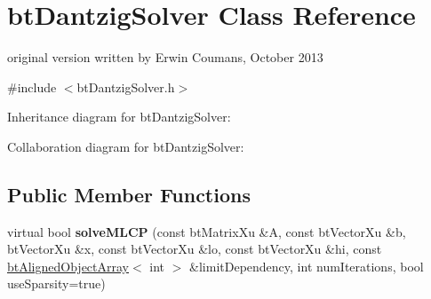 \hypertarget{classbt_dantzig_solver}{\section{bt\+Dantzig\+Solver Class Reference}
\label{classbt_dantzig_solver}
}


original version written by Erwin Coumans, October 2013  




{\ttfamily \#include $<$bt\+Dantzig\+Solver.\+h$>$}



Inheritance diagram for bt\+Dantzig\+Solver\+:


Collaboration diagram for bt\+Dantzig\+Solver\+:
\subsection*{Public Member Functions}
\begin{DoxyCompactItemize}
\item 
\hypertarget{classbt_dantzig_solver_a9c660881e66a59e3647da9e02c014725}{virtual bool {\bfseries solve\+M\+L\+C\+P} (const bt\+Matrix\+Xu \&A, const bt\+Vector\+Xu \&b, bt\+Vector\+Xu \&x, const bt\+Vector\+Xu \&lo, const bt\+Vector\+Xu \&hi, const \hyperlink{classbt_aligned_object_array}{bt\+Aligned\+Object\+Array}$<$ int $>$ \&limit\+Dependency, int num\+Iterations, bool use\+Sparsity=true)}\label{classbt_dantzig_solver_a9c660881e66a59e3647da9e02c014725}

\end{DoxyCompactItemize}
